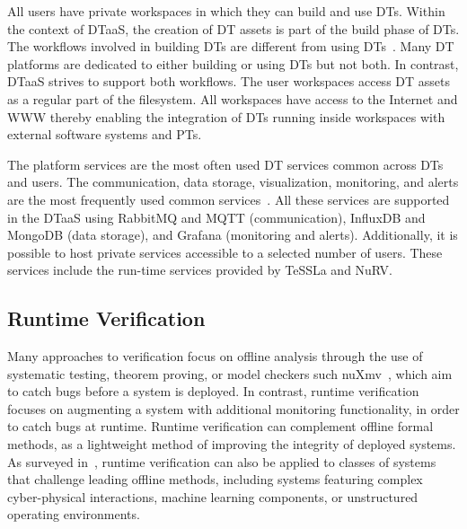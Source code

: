 All users have private workspaces in which they can build and use DTs.
Within the context of DTaaS, the creation of DT assets is part of the build phase of DTs.
The workflows involved in building DTs are different from using DTs~\cite{Prasad&21a}. Many DT platforms are dedicated to either building or using DTs but not both. In contrast, DTaaS strives to support both workflows.
The user workspaces access DT assets as a regular part of the filesystem.
All workspaces have access to the Internet and WWW thereby enabling the integration of DTs running inside workspaces with external software systems and PTs.

The platform services are the most often used DT services common across DTs and users. The communication, data storage, visualization, monitoring, and alerts are the most frequently used common services~\cite{qi2021enabling}.
All these services are supported in the DTaaS using RabbitMQ and MQTT (communication), InfluxDB and MongoDB (data storage), and Grafana (monitoring and alerts).
Additionally, it is possible to host private services accessible to a selected number of users. These services include the run-time services provided by TeSSLa and NuRV.


\subsection{Runtime Verification}

Many approaches to verification focus on offline analysis through the use of systematic testing, theorem proving, or model checkers such nuXmv~\cite{cavada2014nuxmv}, which aim to catch bugs before a system is deployed.
In contrast, runtime verification focuses on augmenting a system with additional monitoring functionality, in order to catch bugs at runtime.
Runtime verification can complement offline formal methods, as a lightweight method of improving the integrity of deployed systems.
As surveyed in~\cite{sanchez2019advancedrvsurvey}, runtime verification can also be applied to classes of systems that challenge leading offline methods, including systems featuring complex cyber-physical interactions, machine learning components, or unstructured operating environments.

